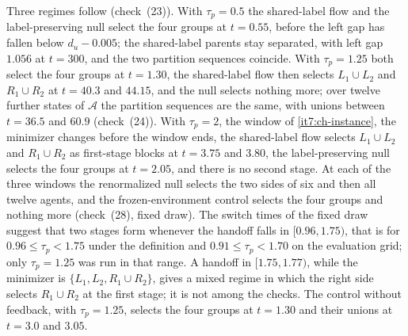 \documentclass[11pt,letterpaper]{report}
\begin{document}
Three regimes follow (check~(23)). With $\tau_p=0.5$ the shared-label flow and the label-preserving null select the four groups at $t=0.55$, before the left gap has fallen below $d_u-0.005$; the shared-label parents stay separated, with left gap $1.056$ at $t=300$, and the two partition sequences coincide. With $\tau_p=1.25$ both select the four groups at $t=1.30$, the shared-label flow then selects $L_1\cup L_2$ and $R_1\cup R_2$ at $t=40.3$ and $44.15$, and the null selects nothing more; over twelve further states of $\mathcal A$ the partition sequences are the same, with unions between $t=36.5$ and $60.9$ (check~(24)). With $\tau_p=2$, the window of \cref{it7:ch-instance}, the minimizer changes before the window ends, the shared-label flow selects $L_1\cup L_2$ and $R_1\cup R_2$ as first-stage blocks at $t=3.75$ and $3.80$, the label-preserving null selects the four groups at $t=2.05$, and there is no second stage. At each of the three windows the renormalized null selects the two sides of six and then all twelve agents, and the frozen-environment control selects the four groups and nothing more (check~(28), fixed draw). The switch times of the fixed draw suggest that two stages form whenever the handoff falls in $[0.96,1.75)$, that is for $0.96\le\tau_p<1.75$ under the definition and $0.91\le\tau_p<1.70$ on the evaluation grid; only $\tau_p=1.25$ was run in that range. A handoff in $[1.75,1.77)$, while the minimizer is $\{L_1,L_2,R_1\cup R_2\}$, gives a mixed regime in which the right side selects $R_1\cup R_2$ at the first stage; it is not among the checks. The control without feedback, with $\tau_p=1.25$, selects the four groups at $t=1.30$ and their unions at $t=3.0$ and $3.05$.
\end{document}
